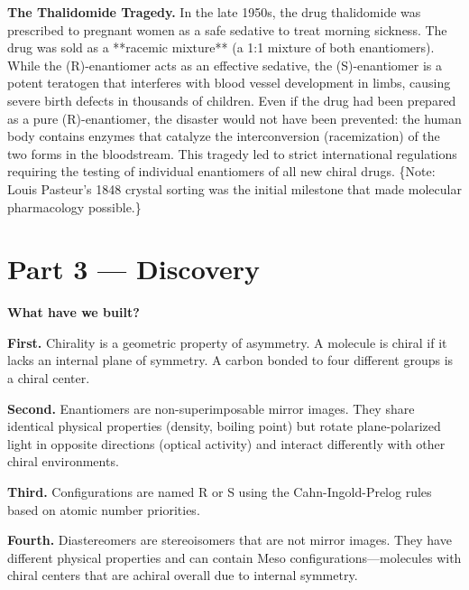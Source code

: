 \documentclass[12pt, a4paper]{book}
\begin{document}
\begin{historybox}
\textbf{The Thalidomide Tragedy.}
In the late 1950s, the drug thalidomide was prescribed to pregnant women as a safe sedative to treat morning sickness. The drug was sold as a **racemic mixture** (a 1:1 mixture of both enantiomers). While the (R)-enantiomer acts as an effective sedative, the (S)-enantiomer is a potent teratogen that interferes with blood vessel development in limbs, causing severe birth defects in thousands of children. 
Even if the drug had been prepared as a pure (R)-enantiomer, the disaster would not have been prevented: the human body contains enzymes that catalyze the interconversion (racemization) of the two forms in the bloodstream. This tragedy led to strict international regulations requiring the testing of individual enantiomers of all new chiral drugs.
\{Note: Louis Pasteur's 1848 crystal sorting was the initial milestone that made molecular pharmacology possible.\}
\end{historybox}

\newpage

\section{Part 3 --- Discovery}

\begin{discoverybox}
\textbf{What have we built?}

\textbf{First.} Chirality is a geometric property of asymmetry. A molecule is chiral if it lacks an internal plane of symmetry. A carbon bonded to four different groups is a chiral center.

\textbf{Second.} Enantiomers are non-superimposable mirror images. They share identical physical properties (density, boiling point) but rotate plane-polarized light in opposite directions (optical activity) and interact differently with other chiral environments.

\textbf{Third.} Configurations are named R or S using the Cahn-Ingold-Prelog rules based on atomic number priorities.

\textbf{Fourth.} Diastereomers are stereoisomers that are not mirror images. They have different physical properties and can contain Meso configurations—molecules with chiral centers that are achiral overall due to internal symmetry.
\end{discoverybox}

\newpage
\end{document}
